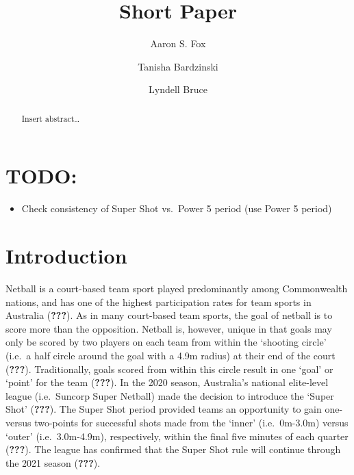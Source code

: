 \documentclass[]{elsarticle} %
\providecommand{\tightlist}{%
  \setlength{\itemsep}{0pt}\setlength{\parskip}{0pt}}
\begin{document}
\begin{frontmatter}

  \title{Short Paper}
    \author[Centre for Sport Research]{Aaron S. Fox}
  
    \author[Centre for Sport Research]{Tanisha Bardzinski}
  
    \author[Centre for Sport Research]{Lyndell Bruce}
  
      \address[Centre for Sport Research]{Centre for Sport Research,
School of Exercise and Nutrition Sciences, Deakin University, Geelong,
Australia}
  
  \begin{abstract}
  Insert abstract\ldots{}
  \end{abstract}
  
 \end{frontmatter}

\hypertarget{todo}{%
\section{TODO:}\label{todo}}

\begin{itemize}
\tightlist
\item
  Check consistency of Super Shot vs.~Power 5 period (use Power 5
  period)
\end{itemize}

\hypertarget{introduction}{%
\section{Introduction}\label{introduction}}

Netball is a court-based team sport played predominantly among
Commonwealth nations, and has one of the highest participation rates for
team sports in Australia ({\textbf{???}}). As in many court-based team
sports, the goal of netball is to score more than the opposition.
Netball is, however, unique in that goals may only be scored by two
players on each team from within the `shooting circle' (i.e.~a half
circle around the goal with a 4.9m radius) at their end of the court
({\textbf{???}}). Traditionally, goals scored from within this circle
result in one `goal' or `point' for the team ({\textbf{???}}). In the
2020 season, Australia's national elite-level league (i.e.~Suncorp Super
Netball) made the decision to introduce the `Super Shot'
({\textbf{???}}). The Super Shot period provided teams an opportunity to
gain one- versus two-points for successful shots made from the `inner'
(i.e.~0m-3.0m) versus `outer' (i.e.~3.0m-4.9m), respectively, within the
final five minutes of each quarter ({\textbf{???}}). The league has
confirmed that the Super Shot rule will continue through the 2021 season
({\textbf{???}}).
\end{document}
